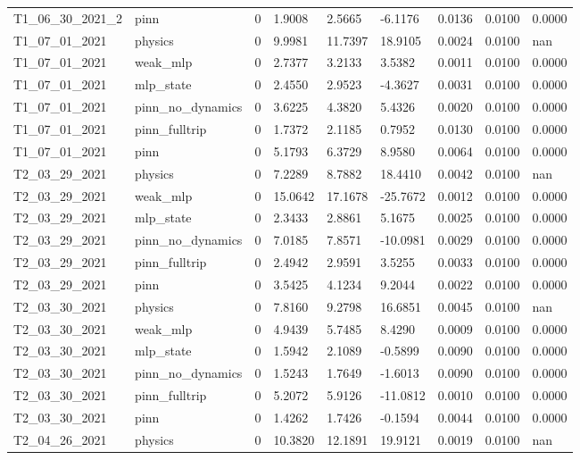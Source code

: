 \begin{table}[t]
\begin{tabular}{lllllllll}
T1\_06\_30\_2021\_2 & pinn & 0 & 1.9008 & 2.5665 & -6.1176 & 0.0136 & 0.0100 & 0.0000 \\
T1\_07\_01\_2021 & physics & 0 & 9.9981 & 11.7397 & 18.9105 & 0.0024 & 0.0100 & nan \\
T1\_07\_01\_2021 & weak\_mlp & 0 & 2.7377 & 3.2133 & 3.5382 & 0.0011 & 0.0100 & 0.0000 \\
T1\_07\_01\_2021 & mlp\_state & 0 & 2.4550 & 2.9523 & -4.3627 & 0.0031 & 0.0100 & 0.0000 \\
T1\_07\_01\_2021 & pinn\_no\_dynamics & 0 & 3.6225 & 4.3820 & 5.4326 & 0.0020 & 0.0100 & 0.0000 \\
T1\_07\_01\_2021 & pinn\_fulltrip & 0 & 1.7372 & 2.1185 & 0.7952 & 0.0130 & 0.0100 & 0.0000 \\
T1\_07\_01\_2021 & pinn & 0 & 5.1793 & 6.3729 & 8.9580 & 0.0064 & 0.0100 & 0.0000 \\
T2\_03\_29\_2021 & physics & 0 & 7.2289 & 8.7882 & 18.4410 & 0.0042 & 0.0100 & nan \\
T2\_03\_29\_2021 & weak\_mlp & 0 & 15.0642 & 17.1678 & -25.7672 & 0.0012 & 0.0100 & 0.0000 \\
T2\_03\_29\_2021 & mlp\_state & 0 & 2.3433 & 2.8861 & 5.1675 & 0.0025 & 0.0100 & 0.0000 \\
T2\_03\_29\_2021 & pinn\_no\_dynamics & 0 & 7.0185 & 7.8571 & -10.0981 & 0.0029 & 0.0100 & 0.0000 \\
T2\_03\_29\_2021 & pinn\_fulltrip & 0 & 2.4942 & 2.9591 & 3.5255 & 0.0033 & 0.0100 & 0.0000 \\
T2\_03\_29\_2021 & pinn & 0 & 3.5425 & 4.1234 & 9.2044 & 0.0022 & 0.0100 & 0.0000 \\
T2\_03\_30\_2021 & physics & 0 & 7.8160 & 9.2798 & 16.6851 & 0.0045 & 0.0100 & nan \\
T2\_03\_30\_2021 & weak\_mlp & 0 & 4.9439 & 5.7485 & 8.4290 & 0.0009 & 0.0100 & 0.0000 \\
T2\_03\_30\_2021 & mlp\_state & 0 & 1.5942 & 2.1089 & -0.5899 & 0.0090 & 0.0100 & 0.0000 \\
T2\_03\_30\_2021 & pinn\_no\_dynamics & 0 & 1.5243 & 1.7649 & -1.6013 & 0.0090 & 0.0100 & 0.0000 \\
T2\_03\_30\_2021 & pinn\_fulltrip & 0 & 5.2072 & 5.9126 & -11.0812 & 0.0010 & 0.0100 & 0.0000 \\
T2\_03\_30\_2021 & pinn & 0 & 1.4262 & 1.7426 & -0.1594 & 0.0044 & 0.0100 & 0.0000 \\
T2\_04\_26\_2021 & physics & 0 & 10.3820 & 12.1891 & 19.9121 & 0.0019 & 0.0100 & nan \\

\end{tabular}
\end{table}
